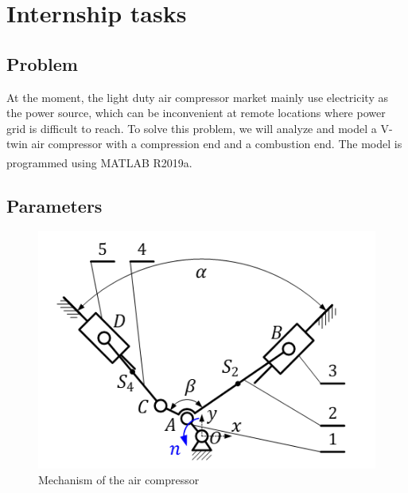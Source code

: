\chapter{Internship tasks }
\section{Problem}
At the moment, the light duty air compressor market mainly use electricity as the power source, which can be inconvenient at remote locations where power grid is difficult to reach. To solve this problem, we will analyze and model a V-twin air compressor with a compression end and a combustion end. The model is programmed using MATLAB\textsuperscript{\textregistered} R2019a.
\section{Parameters}
\begin{figure}
	\centering
	\includegraphics[width=0.5\linewidth]{03}
	\caption{Mechanism of the air compressor}
	\label{fig:03}
\end{figure}
